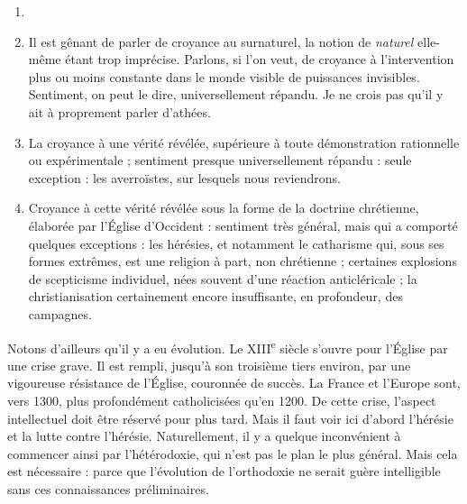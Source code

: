 \documentclass[french,twoside]{book} %
\begin{document}
\begin{enumerate}[itemsep=0pt,]
\item[] \hspace{-1.5em}{\bfseries Essayons de préciser :}
\item Il est gênant de parler de croyance au surnaturel, la notion de \emph{naturel} elle-même étant trop imprécise. Parlons, si l’on veut, de croyance à l’intervention plus ou moins constante dans le monde visible de puissances invisibles. Sentiment, on peut le dire, universellement répandu. Je ne crois pas qu’il y ait à proprement parler d’athées.
\item La croyance à une vérité révélée, supérieure à toute démonstration rationnelle ou expérimentale ; sentiment presque universellement répandu : seule exception : les averroïstes, sur lesquels nous reviendrons.
\item Croyance à cette vérité révélée sous la forme de la doctrine chrétienne, élaborée par l’Église d’Occident : sentiment très général, mais qui a comporté quelques exceptions : les hérésies, et notamment le catharisme qui, sous ses formes extrêmes, est une religion à part, non chrétienne ; certaines explosions de scepticisme individuel, nées souvent d’une réaction anticléricale ; la christianisation certainement encore insuffisante, en profondeur, des campagnes.

\end{enumerate}\noindent Notons d’ailleurs qu’il y a eu évolution. Le XIII\textsuperscript{e} siècle s’ouvre pour l’Église par une crise grave. Il est rempli, jusqu’à son troisième tiers environ, par une vigoureuse résistance de l’Église, couronnée de succès. La France et l’Europe sont, vers 1300, plus profondément catholicisées qu’en 1200. De cette crise, l’aspect intellectuel doit être réservé pour plus tard. Mais il faut voir ici d’abord l’hérésie et la lutte contre l’hérésie. Naturellement, il y a quelque inconvénient à commencer ainsi par l’hétérodoxie, qui n’est pas le plan le plus général. Mais cela est nécessaire : parce que l’évolution de l’orthodoxie ne serait guère intelligible sans ces connaissances préliminaires.
\end{document}
